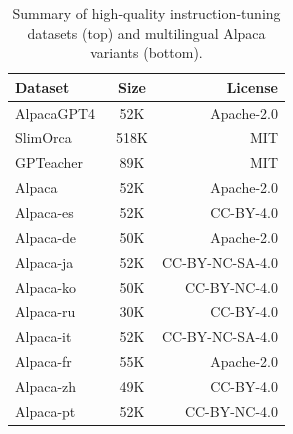 \begin{table}[h]
    \centering
    \renewcommand\arraystretch{1.3}
    \setlength{\tabcolsep}{1.5mm}
    \begin{tabular}{lcr}
        \toprule
        Dataset & Size & License \\
        \midrule
        AlpacaGPT4~\citep{alpaca-gpt4}        & 52K & Apache-2.0 \\
        SlimOrca~\citep{slimorca}            & 518K & MIT        \\
        GPTeacher~\citep{gpteacher}          & 89K & MIT        \\
        Alpaca~\citep{alpaca}                & 52K & Apache-2.0 \\
        \midrule
        Alpaca-es\tablefootnote{\url{https://huggingface.co/datasets/bertin-project/alpaca-spanish}} & 52K & CC-BY-4.0        \\
        Alpaca-de\tablefootnote{\url{https://huggingface.co/datasets/mayflowergmbh/alpaca-gpt4_de}}     & 50K & Apache-2.0       \\
        Alpaca-ja\tablefootnote{\url{https://huggingface.co/datasets/fujiki/japanese_alpaca_data}}    & 52K & CC-BY-NC-SA-4.0  \\
        Alpaca-ko\tablefootnote{\url{https://huggingface.co/datasets/Bingsu/ko_alpaca_data}}         & 50K & CC-BY-NC-4.0     \\
        Alpaca-ru\tablefootnote{\url{https://huggingface.co/datasets/IlyaGusev/ru_turbo_alpaca}}      & 30K & CC-BY-4.0        \\
        Alpaca-it\tablefootnote{\url{https://huggingface.co/datasets/mchl-labs/stambecco_data_it}}    & 52K & CC-BY-NC-SA-4.0  \\
        Alpaca-fr\tablefootnote{\url{https://huggingface.co/datasets/jpacifico/French-Alpaca-dataset-Instruct-55K}} & 55K & Apache-2.0       \\
        Alpaca-zh\tablefootnote{\url{https://huggingface.co/datasets/llm-wizard/alpaca-gpt4-data-zh}}  & 49K & CC-BY-4.0        \\
        Alpaca-pt\tablefootnote{\url{https://huggingface.co/datasets/dominguesm/alpaca-data-pt-br}}   & 52K & CC-BY-NC-4.0     \\
        \bottomrule
    \end{tabular}
    \vskip 0.2in
    \caption{Summary of high‐quality instruction‐tuning datasets (top) and multilingual Alpaca variants (bottom).}
    \label{tab:stat_data}
\end{table} 

